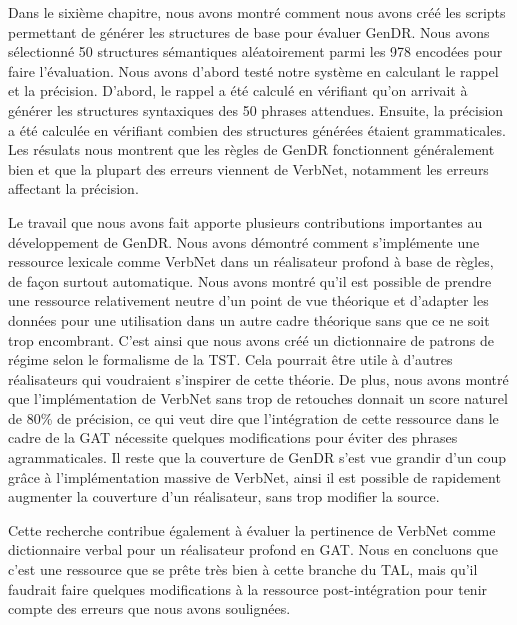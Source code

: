 Dans le sixième chapitre, nous avons montré comment nous avons créé les scripts permettant de générer les structures de base pour évaluer GenDR. Nous avons sélectionné 50 structures sémantiques aléatoirement parmi les 978 encodées pour faire l'évaluation. Nous avons d'abord testé notre système en calculant le rappel et la précision. D'abord, le rappel a été calculé en vérifiant qu'on arrivait à générer les structures syntaxiques des 50 phrases attendues. Ensuite, la précision a été calculée en vérifiant combien des structures générées étaient grammaticales. Les résulats nous montrent que les règles de GenDR fonctionnent généralement bien et que la plupart des erreurs viennent de VerbNet, notamment les erreurs affectant la précision.

Le travail que nous avons fait apporte plusieurs contributions importantes au développement de GenDR. Nous avons démontré comment s'implémente une ressource lexicale comme VerbNet dans un réalisateur profond à base de règles, de façon surtout automatique. Nous avons montré qu'il est possible de prendre une ressource relativement neutre d'un point de vue théorique et d'adapter les données pour une utilisation dans un autre cadre théorique sans que ce ne soit trop encombrant. C'est ainsi que nous avons créé un dictionnaire de patrons de régime selon le formalisme de la \ac{TST}. Cela pourrait être utile à d'autres réalisateurs qui voudraient s'inspirer de cette théorie. De plus, nous avons montré que l'implémentation de VerbNet sans trop de retouches donnait un score naturel de 80\% de précision, ce qui veut dire que l'intégration de cette ressource dans le cadre de la \ac{GAT} nécessite quelques modifications pour éviter des phrases agrammaticales. Il reste que la couverture de GenDR s'est vue grandir d'un coup grâce à l'implémentation massive de VerbNet, ainsi il est possible de rapidement augmenter la couverture d'un réalisateur, sans trop modifier la source. 

Cette recherche contribue également à évaluer la pertinence de VerbNet comme dictionnaire verbal pour un réalisateur profond en \ac{GAT}. Nous en concluons que c'est une ressource que se prête très bien à cette branche du \ac{TAL}, mais qu'il faudrait faire quelques modifications à la ressource post-intégration pour tenir compte des erreurs que nous avons soulignées.

